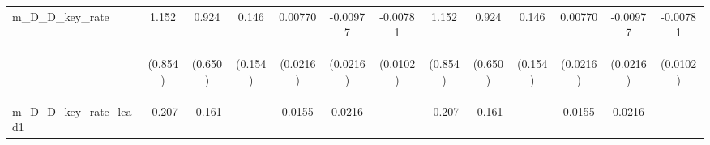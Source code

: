 \documentclass[]{article}
\begin{document}
\begin{center}
\begin{tabular}{lcccccccccccc}
m\_D\_D\_key\_rate & 1.152 & 0.924 & 0.146 & 0.00770 & -0.00977 & -0.00781 & 1.152 & 0.924 & 0.146 & 0.00770 & -0.00977 & -0.00781 \\
\vspace{4pt} & \begin{footnotesize}(0.854)\end{footnotesize} & \begin{footnotesize}(0.650)\end{footnotesize} & \begin{footnotesize}(0.154)\end{footnotesize} & \begin{footnotesize}(0.0216)\end{footnotesize} & \begin{footnotesize}(0.0216)\end{footnotesize} & \begin{footnotesize}(0.0102)\end{footnotesize} & \begin{footnotesize}(0.854)\end{footnotesize} & \begin{footnotesize}(0.650)\end{footnotesize} & \begin{footnotesize}(0.154)\end{footnotesize} & \begin{footnotesize}(0.0216)\end{footnotesize} & \begin{footnotesize}(0.0216)\end{footnotesize} & \begin{footnotesize}(0.0102)\end{footnotesize} \\
m\_D\_D\_key\_rate\_lead1 & -0.207 & -0.161 &  & 0.0155 & 0.0216 &  & -0.207 & -0.161 &  & 0.0155 & 0.0216 &  \\

\end{tabular}
\end{center}
\end{document}
